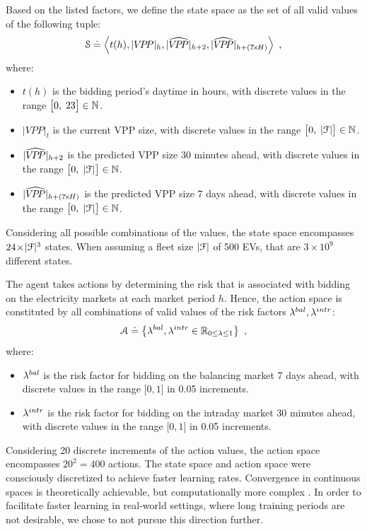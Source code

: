 \documentclass[a4paper, 12pt]{article}
\let\cite\shortcite
\begin{document}
Based on the listed factors, we define the state space as the set of all
valid values of the following tuple:
\begin{equation}
    \S \defeq \left\langle t(h), \vpp{h}, \vpphat{h+2}, \vpphat{h+(7\!\times\!H)}\right\rangle \text{ ,}
\end{equation}
where:
\begin{itemize}
\item \(t(h)\) is the bidding period's daytime in hours, with discrete values in the range
\(\big[0,\;23\big]\in\mathbb{N}\).
\item \(|VPP|_t\) is the current VPP size, with discrete values in the range
\(\big[0,\;|{\cal{F}}|\big] \in \mathbb{N}\).
\item \({|\widehat{V\!P\!P}|_{h+2}}\) is the predicted VPP size 30 minutes ahead, with discrete values in the range
\(\big[0,\;|{\cal{F}}|\big] \in \mathbb{N}\).
\item \({|\widehat{V\!P\!P}|_{h+(7\!\times\!H)}}\) is the predicted VPP size 7 days ahead, with discrete
values in the range \(\big[0,\;|{\cal{F}}|\big] \in \mathbb{N}\).
\end{itemize}
Considering all possible combinations of the values, the state space encompasses
\(24\!\times\!|{\cal{F}}|^3\) states. When assuming a fleet size \(|{\cal{F}}|\) of 500 EVs, that
are \(3\!\times\!10^9\) different states.

The agent takes actions by determining the risk that is associated with bidding
on the electricity markets at each market period \(h\). Hence, the action space is
constituted by all combinations of valid values of the risk factors
\(\lambda^{bal}_{},\lambda^{intr}_{}\):
\begin{equation}
    {\cal A} \doteq \left\{\lambda^{bal}_{},\lambda^{intr}_{} \in \mathbb{R}_{0 \leq \lambda \leq 1} \right\} \text{ ,}
\end{equation}
where:
\begin{itemize}
\item \(\lambda^{bal}_{}\) is the risk factor for bidding on the balancing market 7 days ahead,
with discrete values in the range \(\big[0,1\big]\) in 0.05 increments.
\item \(\lambda^{intr}_{}\) is the risk factor for bidding on the intraday market 30 minutes
ahead, with discrete values in the range \(\big[0,1\big]\) in 0.05 increments.
\end{itemize}
Considering 20 discrete increments of the action values, the action space
encompasses \(20^2 = 400\) actions. The state space and action space were
consciously discretized to achieve faster learning rates. Convergence in
continuous spaces is theoretically achievable, but computationally more complex
\cite{sutton18_reinf}. In order to facilitate faster learning in real-world
settings, where long training periods are not desirable, we chose to not pursue
this direction further.
\end{document}
